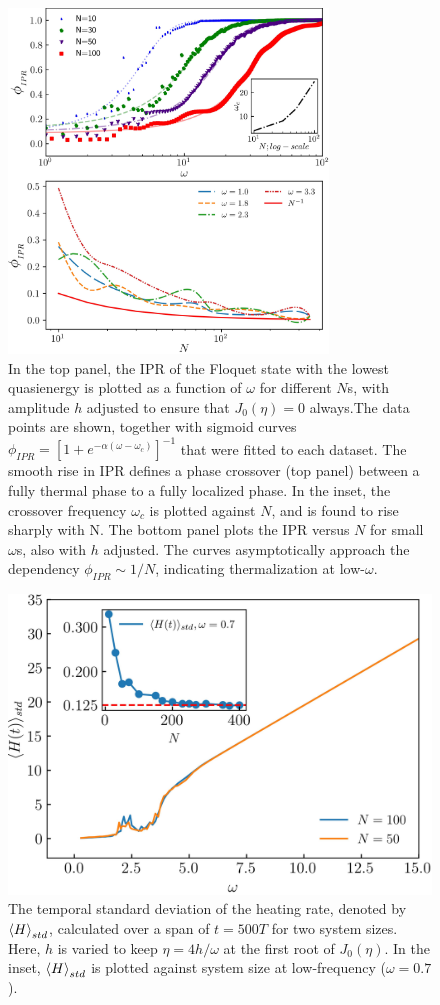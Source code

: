 \documentclass[%
reprint,
superscriptaddress,
amsmath,amssymb,
aps,
prb,
showkeys,
]{revtex4-2}
\begin{document}
\begin{figure}[t!]
	\centering
	\includegraphics[width =8.5cm]{phase_crossover_LMG.jpeg}
	\caption{In the top panel, the IPR of the Floquet state with the lowest quasienergy is plotted as a function of $\omega$ for different $N$s, with amplitude $h$ adjusted to ensure that $J_0(\eta)=0$ always.The data points are shown, together with sigmoid curves $\phi_{IPR}=\left[1+e^{-\alpha\left(\omega-\omega_c\right)}\right]^{-1}$ that were fitted to each dataset. The smooth rise in IPR defines a phase crossover (top panel) between a fully thermal phase to a fully localized phase. In the inset, the crossover frequency $\omega_c$ is plotted against $N$, and  is found to rise sharply with N. The bottom panel plots the IPR versus $N$ for small $\omega$s, also with $h$ adjusted. The curves asymptotically approach the dependency $\phi_{IPR}\sim 1/N$, indicating thermalization at low-$\omega$.}
	\label{fig:phase_crossover}
\end{figure}	
\begin{figure}[ht!]
	\centering
	\includegraphics[width = 8.cm]{hbar_avg_std.jpeg}
	\caption{The temporal standard deviation of the heating rate, denoted by $\expval{H}_{std}$, calculated over a span of $t=500 T$ for two system sizes. Here, $h$ is varied to keep $\eta = 4h/\omega$ at the first root of $J_0(\eta)$. In the inset, $\expval{H}_{std}$ is plotted against system size at low-frequency ($\omega=0.7$).}
	\label{fig:havg_std}
\end{figure}
\end{document}
